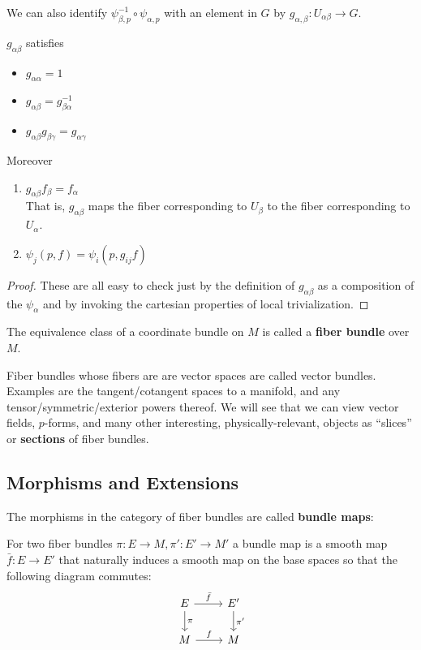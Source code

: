 		We can also identify $\psi^{-1}_{\beta, p} \circ \psi_{\alpha, p}$ with an element in $G$ by $g_{\alpha, \beta}: U_{\alpha \beta} \rightarrow G$.
		\begin{prop}
			$g_{\alpha \beta}$ satisfies 
			\begin{itemize}
				\item $g_{\alpha \alpha} = 1$
				\item $g_{\alpha \beta} = g^{-1}_{\beta \alpha}$
				\item $g_{\alpha \beta} g_{\beta \gamma} = g_{\alpha \gamma}$
			\end{itemize}

			Moreover 
			\begin{enumerate}
				\item $g_{\alpha \beta} f_\beta = f_\alpha$\\ That is, $g_{\alpha \beta}$ maps the fiber corresponding to $U_\beta$ to the fiber corresponding to $U_\alpha$.
				\item $\psi_{j} (p, f) = \psi_{i} (p, g_{ij} f)$
			\end{enumerate}
		\end{prop}
		
		\begin{proof}
			These are all easy to check just by the definition of $g_{\alpha \beta}$ as a composition of the $\psi_\alpha$ and by invoking the cartesian properties of local trivialization.
		\end{proof}
		The equivalence class of a coordinate bundle on $M$ is called a \textbf{fiber bundle} over $M$. 
		
		Fiber bundles whose fibers are are vector spaces are called vector bundles. Examples are the tangent/cotangent spaces to a manifold, and any tensor/symmetric/exterior powers thereof. We will see that we can view vector fields, $p$-forms, and many other interesting, physically-relevant, objects as ``slices'' or \textbf{sections} of fiber bundles.
		
		\subsection{Morphisms and Extensions}
		The morphisms in the category of fiber bundles are called \textbf{bundle maps}:
		
		\begin{defn}
			For two fiber bundles $\pi: E \rightarrow M, \pi': E' \rightarrow M'$ a bundle map is a smooth map $\bar f: E \rightarrow E'$ that naturally induces a smooth map on the base spaces so that the following diagram commutes:
			\[
			\begin{tikzcd}
			E \arrow{r}{\bar f} \arrow{d}{\pi} & E' \arrow{d}{\pi'} \\
			M \arrow{r}{f} & M
			\end{tikzcd}
			\]
		\end{defn}
		

